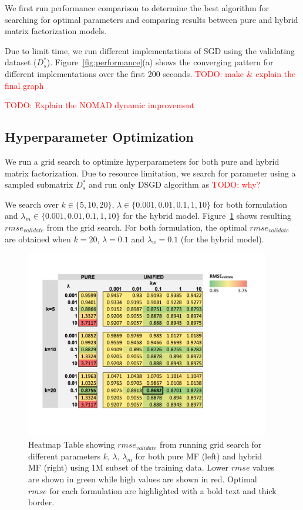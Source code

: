 \documentclass{article} %
\newcommand{\todo}[1]{\textcolor{red}{TODO: #1}}
\begin{document}
We first run performance comparison to determine the best algorithm for
searching for optimal parameters and comparing results  between pure and
hybrid matrix factorization models.

Due to limit time, we run different implementations of SGD using the
validating dataset ($D_s^*$).  Figure~\ref{fig:performance}(a) shows the
converging pattern for different implementations over the first 200 seconds.
\todo{make & explain the final graph}

\todo{Explain the NOMAD dynamic improvement }

\subsection{Hyperparameter Optimization}

We run a grid search to optimize hyperparameters for both pure and hybrid
matrix factorization.
Due to resource limitation, we search for parameter using a sampled submatrix
$D_s^*$ and run only DSGD algorithm as \todo{why?}

We search over $k \in \{5, 10, 20\}$, $\lambda \in \{
0.001, 0.01, 0.1, 1, 10\}$ for both formulation and $\lambda_m \in \{
0.001, 0.01, 0.1, 1, 10\}$ for the hybrid model.  Figure~\ref{fig:gridsearch} shows resulting $rmse_{validate}$ from the grid search.  For both formulation, the optimal $rmse_{validate}$ are obtained when
$k=20$, $\lambda=0.1$ and $\lambda_w=0.1$ (for the hybrid model).

\begin{figure}[h]
\centering
\includegraphics[width=4.2in]{figures/grid}
\caption{\label{fig:gridsearch} Heatmap Table showing $rmse_{validate}$ from
running grid search for different parameters $k$, $\lambda$, $\lambda_m$ for
both pure MF (left) and hybrid MF (right) using 1M subset of the training data.  Lower $rmse$
values are shown in green while high values are shown in red.  Optimal $rmse$
for each formulation are highlighted with a bold text and thick border.}
\end{figure}
\end{document}

